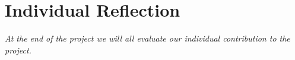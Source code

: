 \newpage
\section{Individual Reflection}
\textit{At the end of the project we will all evaluate our individual contribution to the project.}





